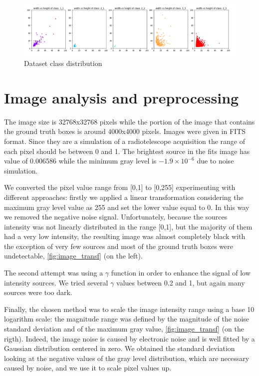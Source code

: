 \documentclass[a4paper,10pt]{report}
\begin{document}
\begin{figure}[h]
  \center
  \includegraphics[width=0.85\linewidth]{scatter_class.png}
  \caption{Dataset class distribution}
  \label{fig:scatter_class}
\end{figure}

\section{Image analysis and preprocessing}
The image size is 32768x32768 pixels while the portion of the image that contains the ground truth boxes is around 4000x4000 pixels.
Images were given in FITS format. Since they are a simulation of a radiotelescope acquisition the range of each pixel should be between 0 and 1.
The brightest source in the fits image has value of 0.006586 while the minimum gray level is  $-1.9 \times 10^{-6}$ due to noise simulation.

We converted the pixel value range from [0,1] to [0,255] experimenting with different approaches: firstly we applied a linear transformation considering the maximum gray level value as 255 and set the lower value equal to 0. In this way we removed the negative noise signal. Unfortunately, because the sources intensity was not linearly distributed in the range [0,1], but the majority of them had a very low intensity, the resulting image was almost completely black with the exception of very few sources and most of the ground truth boxes were undetectable, \ref{fig:image_transf} (on the left).

The second attempt was using a $\gamma$ function in order to enhance the signal of low intensity sources. We tried several $\gamma$ values between 0.2 and 1, but again many sources were too dark.

Finally, the chosen method was to scale the image intensity range using a base 10 logarithm scale: the magnitude range was defined by the magnitude of the noise standard deviation and of the maximum gray value, \ref{fig:image_transf} (on the rigth). Indeed, the image noise is caused by electronic noise and is well fitted by a Gaussian distribution centered in zero. We obtained the standard deviation looking at the negative values of the gray level distribution, which are necessary caused by noise, and we use it to scale pixel values up.
\end{document}
